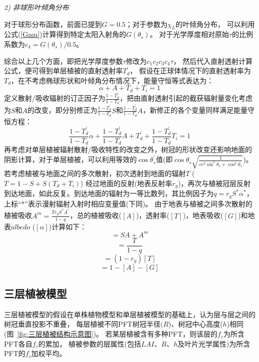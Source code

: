 \textit{2) 非球形叶倾角分布}

对于球形分布函数，前面已提到$G=0.5$；对于参数为$\chi_L$的叶倾角分布，
可以利用公式(\ref{Gmu})计算得到特定太阳入射角的$G\left(\theta_s\right)$。
对于光学厚度相对原始$\tau$的比例系数为$c_4=G\left(\theta_s\right)/0.5$。

综合以上几个方面，即把光学厚度参数$\tau$修改为$c_1c_2c_3c_4\tau$，
然后代入直射透射计算公式，便可得到单层植被的直射透射率$T_d^\prime$，
假设在正球体情况下的直射透射率为$T_d$，在不考虑椭球形状和叶倾角分布情况下，能量守恒等式表达为：
\begin{equation}
\alpha+A+T_{d}+T_{i}=1
\end{equation}
定义散射/吸收辐射的订正因子为$\frac{1-T_d^\prime}{1-T_d}$，把由直射透射引起的截获辐射量变化考虑为$S$和$A$的改变，即分别修正为$\frac{1-T_d^\prime}{1-T_d}S$和$\frac{1-T_d^\prime}{1-T_d}A$，新修正的各个变量同样满足能量守恒方程：
\begin{equation}
\frac{1-T_{d}^{\prime}}{1-T_{d}} \alpha+\frac{1-T_{d}^{\prime}}{1-T_{d}} A+T_{d}^{\prime}+\frac{1-T_{d}^{\prime}}{1-T_{d}} T_{i}=1
\end{equation}
再考虑对单层植被辐射散射/吸收特性的改变之外，树冠的形状改变还影响地面的阴影计算，对于单层植被，可以利用等效的$\cos{\theta_s^\prime}$值(即$\cos{\theta_s}\sqrt{\frac{1}{{cr}^2\sin^2{\theta_s}+\cos^2{\theta_s}}}$)。 
若考虑植被与地面之间的多次散射，初次透射到地面的辐射$T$ ($T=1-S+S\left(T_d+T_i\right)$) 经过地面的反射(地表反射率$r_g$)，再次与植被冠层反射到达地面，如此反复。到达地面的辐射为一等比数列，其比例因子为$q=r_gS^\ast\alpha^\ast$，上标“$\ast$”表示漫射辐射入射时相应变量值(下同)。
由于地表与植被之间多次散射的植被吸收$A^m=\frac{Tr_gS^\ast A^\ast}{1-q}$，总的植被吸收($\left[A\right]$)，透射率($\left[T\right]$)，地表吸收($\left[G\right]$)和地表$albedo$ ($\left[\alpha\right]$)计算如下：
\begin{equation}
[A]=S A+A^{m}
\end{equation}
\begin{equation}
[T]=\frac{T}{1-q}
\end{equation}
\begin{equation}
[G]=\left(1-r_{g}\right)[T]
\end{equation}
\begin{equation}
[\alpha]=1-[A]-[G]
\end{equation}


\subsection{三层植被模型}
三层植被模型的假设在单株植物模型和单层植被模型的基础上，认为层与层之间的树冠垂直投影不重叠，
每层植被不同PFT树冠半径$(R$)、树冠中心高度($h$)相同(图~\ref{fig:三层植被结构示意图})。
若某层植被含有多种PFT，则该层的$f_c$为所含PFT各自$f_c$的累加，
植被参数的层属性(包括$LAI$、$R$、$h$及叶片光学属性)为所含PFT的$f_c$加权平均。

